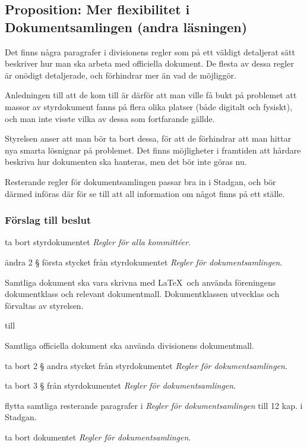 \documentclass[protokoll]{dvd}
\begin{document}
\newpage
\subsection{Proposition: Mer flexibilitet i Dokumentsamlingen (andra läsningen)}

Det finns några paragrafer i divisionens regler som på ett väldigt detaljerat sätt beskriver hur man ska arbeta med officiella dokument.
De flesta av dessa regler är onödigt detaljerade, och förhindrar mer än vad de möjliggör.

Anledningen till att de kom till är därför att man ville få bukt på problemet att massor av styrdokument fanns på flera olika platser (både digitalt och fysiskt), och man inte visste vilka av dessa som fortfarande gällde.

Styrelsen anser att man bör ta bort dessa, för att de förhindrar att man hittar nya smarta lösnignar på problemet.
Det finns möjligheter i framtiden att hårdare beskriva hur dokumenten ska hanteras, men det bör inte göras nu.

Resterande regler för dokumentsamlingen passar bra in i Stadgan, och bör därmed införas där för se till att all information om något finns på ett ställe.

\subsubsection*{Förslag till beslut}

\begin{attsatser}
	\item ta bort styrdokumentet \emph{Regler för alla kommittéer}.

	\item ändra 2 § första stycket från styrdokumentet \emph{Regler för dokumentsamlingen}.

	\begin{displayquote}
		Samtliga dokument ska vara skrivna med \LaTeX~och använda föreningens dokumentklass och relevant dokumentmall.
		Dokumentklassen utvecklas och förvaltas av styrelsen.
	\end{displayquote}

	till

	\begin{displayquote}
		Samtliga officiella dokument ska använda divisionens dokumentmall.
	\end{displayquote}

	\item ta bort 2 § andra stycket från styrdokumentet \emph{Regler för dokumentsamlingen}.

	\item ta bort 3 § från styrdokumentet \emph{Regler för dokumentsamlingen}.

	\item flytta samtliga resterande paragrafer i \emph{Regler för dokumentsamlingen} till 12 kap. i Stadgan.

	\item ta bort dokumentet \emph{Regler för dokumentsamlingen}.
\end{attsatser}
\end{document}
